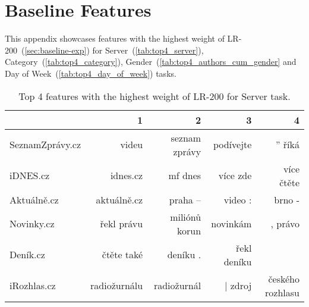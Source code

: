 \chapter{Baseline Features}
\label{ch:baseline_features}
This appendix showcases features with the highest weight of LR-200~(\autoref{sec:baseline-exp}) for
Server~(\autoref{tab:top4_server}), Category~(\autoref{tab:top4_category}), Gender~(\autoref{tab:top4_authors_cum_gender}
and Day of Week~(\autoref{tab:top4_day_of_week}) tasks.

\begin{table}
    \centering\footnotesize\sf
    \begin{tabular}{lrrrr}
        \toprule
        {} &             1 &              2 &            3 &                 4 \\
        \midrule
        SeznamZprávy.cz &         videu &  seznam zprávy &    podívejte &            ” říká \\
        iDNES.cz        &      idnes.cz &        mf dnes &     více zde &        více čtěte \\
        Aktuálně.cz     &   aktuálně.cz &        praha – &      video : &            brno - \\
        Novinky.cz      &    řekl právu &  miliónů korun &     novinkám &           , právo \\
        Deník.cz        &    čtěte také &       deníku . &  řekl deníku &                 ­ \\
        iRozhlas.cz     &  radiožurnálu &    radiožurnál &      | zdroj &  českého rozhlasu \\
        \bottomrule
    \end{tabular}
    \caption{Top 4 features with the highest weight of LR-200 for Server task.}
    \label{tab:top4_server}
\end{table}

